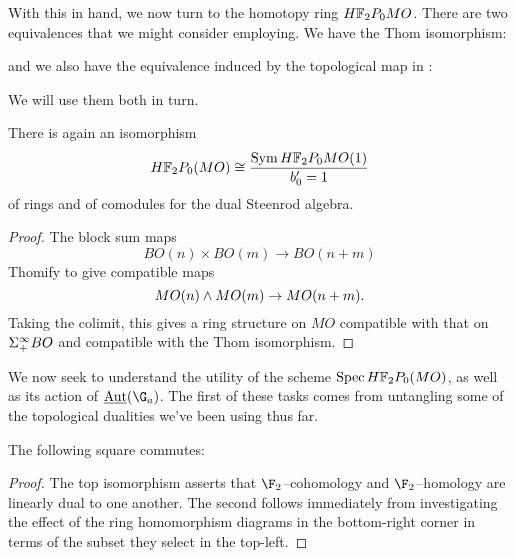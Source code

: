 With this in hand, we now turn to the homotopy ring \(\HFtwo P_0 MO\).  There are two equivalences that we might consider employing.  We have the Thom isomorphism:
\begin{center}
\end{center}
and we also have the equivalence induced by the topological map in :
\begin{center}
\end{center}
We will use them both in turn.

\begin{corollary}\label{HF2MOisFree}
There is again an isomorphism \[\HFtwo P_0(MO) \cong \frac{\Sym \HFtwo P_0 MO(1)}{b'_0 = 1}\] of rings and of comodules for the dual Steenrod algebra.
\end{corollary}
\begin{proof}
The block sum maps \[BO(n) \times BO(m) \to BO(n+m)\] Thomify to give compatible maps \[MO(n) \wedge MO(m) \to MO(n+m).\]  Taking the colimit, this gives a ring structure on \(MO\) compatible with that on \(\Sigma^\infty_+ BO\) and compatible with the Thom isomorphism.
\end{proof}

We now seek to understand the utility of the scheme \(\Spec \HFtwo P_0(MO)\), as well as its action of \(\InternalAut(\G_a)\).  The first of these tasks comes from untangling some of the topological dualities we've been using thus far.
\begin{lemma}\label{DetectingMORingMapsInHomotopy}
The following square commutes:
\begin{center}
\end{center}
\end{lemma}
\begin{proof}
The top isomorphism asserts that \(\F_2\)--cohomology and \(\F_2\)--homology are linearly dual to one another.  The second follows immediately from investigating the effect of the ring homomorphism diagrams in the bottom-right corner in terms of the subset they select in the top-left.
\end{proof}

